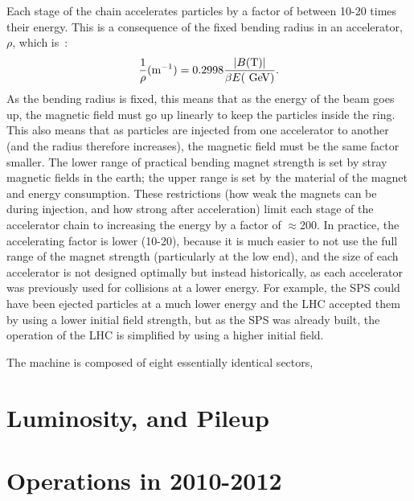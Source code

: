 Each stage of the chain accelerates particles by a factor of between 10-20 times their energy. This is a consequence of the fixed bending radius in an accelerator, $\rho$, which is~\cite{accelerator-book}:
%
\begin{equation}
\frac{1}{\rho} (\mathrm{m}^{-1}) = 0.2998 \frac{|B (\mathrm{T})|}{\beta E (\GeV)}.
\end{equation}
%
As the bending radius is fixed, this means that as the energy of the beam goes up, the magnetic field must go up linearly to keep the particles inside the ring. This also means that as particles are injected from one accelerator to another (and the radius therefore increases), the magnetic field must be the same factor smaller. The lower range of practical bending magnet strength is set by stray magnetic fields in the earth; the upper range is set by the material of the magnet and energy consumption. These restrictions (how weak the magnets can be during injection, and how strong after acceleration) limit each stage of the accelerator chain to increasing the energy by a factor of $\approx$200. In practice, the accelerating factor is lower (10-20), because it is much easier to not use the full range of the magnet strength (particularly at the low end), and the size of each accelerator is not designed optimally but instead historically, as each accelerator was previously used for collisions at a lower energy. For example, the SPS could have been ejected particles at a much lower energy and the LHC accepted them by using a lower initial field strength, but as the SPS was already built, the operation of the LHC is simplified by using a higher initial field. 



The machine is composed of eight essentially identical sectors, 

\section{Luminosity, and Pileup}
\label{lhc:luminosity-and-pileup}

\section{Operations in 2010-2012}
